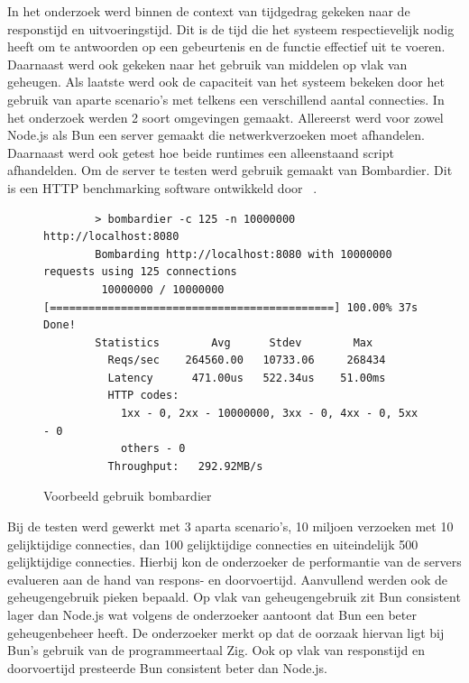 In het onderzoek werd binnen de context van tijdgedrag gekeken naar de responstijd en uitvoeringstijd. 
Dit is de tijd die het systeem respectievelijk nodig heeft om te antwoorden op een gebeurtenis en de functie effectief uit te voeren.
Daarnaast werd ook gekeken naar het gebruik van middelen op vlak van geheugen.
Als laatste werd ook de capaciteit van het systeem bekeken door het gebruik van aparte scenario's met telkens een verschillend aantal connecties.
In het onderzoek werden 2 soort omgevingen gemaakt. Allereerst werd voor zowel Node.js als Bun een server gemaakt die netwerkverzoeken moet afhandelen.
Daarnaast werd ook getest hoe beide runtimes een alleenstaand script afhandelden.
Om de server te testen werd gebruik gemaakt van Bombardier. Dit is een HTTP benchmarking software ontwikkeld door ~\textcite{Fedoseev2023}.
\begin{figure}[H]
    \centering
    \begin{verbatim}
        > bombardier -c 125 -n 10000000 http://localhost:8080
        Bombarding http://localhost:8080 with 10000000 requests using 125 connections
         10000000 / 10000000 [============================================] 100.00% 37s Done!
        Statistics        Avg      Stdev        Max
          Reqs/sec    264560.00   10733.06     268434
          Latency      471.00us   522.34us    51.00ms
          HTTP codes:
            1xx - 0, 2xx - 10000000, 3xx - 0, 4xx - 0, 5xx - 0
            others - 0
          Throughput:   292.92MB/s
        \end{verbatim}
        \caption{Voorbeeld gebruik bombardier \autocite{Fedoseev2023}}
\end{figure}

Bij de testen werd gewerkt met 3 aparta scenario's, 10 miljoen verzoeken met 10 gelijktijdige connecties, dan 100 gelijktijdige connecties en uiteindelijk 500 gelijktijdige connecties.
Hierbij kon de onderzoeker de performantie van de servers evalueren aan de hand van respons- en doorvoertijd. Aanvullend werden ook de geheugengebruik pieken bepaald.
Op vlak van geheugengebruik zit Bun consistent lager dan Node.js wat volgens de onderzoeker aantoont dat Bun een beter geheugenbeheer heeft. 
De onderzoeker merkt op dat de oorzaak hiervan ligt bij Bun's gebruik van de programmeertaal Zig. 
Ook op vlak van responstijd en doorvoertijd presteerde Bun consistent beter dan Node.js.


